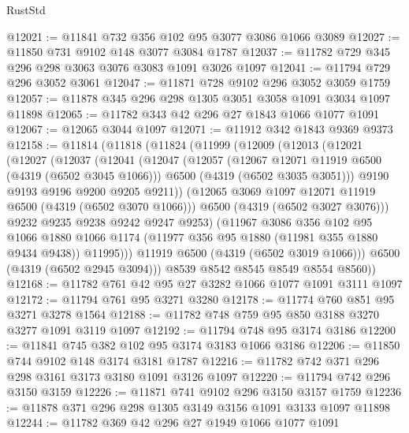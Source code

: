 \begin{lexlean}{RustStd}
\begin{coremodule}
@12021 := @11841 @732 @356 @102 @95 @3077 @3086 @1066 @3089
@12027 := @11850 @731 @9102 @148 @3077 @3084 @1787
@12037 := @11782 @729 @345 @296 @298 @3063 @3076 @3083 @1091 @3026 @1097
@12041 := @11794 @729 @296 @3052 @3061
@12047 := @11871 @728 @9102 @296 @3052 @3059 @1759
@12057 := @11878 @345 @296 @298 @1305 @3051 @3058 @1091 @3034 @1097 @11898
@12065 := @11782 @343 @42 @296 @27 @1843 @1066 @1077 @1091
@12067 := @12065 @3044 @1097
@12071 := @11912 @342 @1843 @9369 @9373
@12158 := @11814
    (@11818
      (@11824
        (@11999
          (@12009
            (@12013
              (@12021
                (@12027
                  (@12037
                    (@12041
                      (@12047
                        (@12057
                          (@12067 @12071 @11919 @6500 (@4319 (@6502 @3045 @1066)))
                          @6500
                          (@4319 (@6502 @3035 @3051)))
                        @9190
                        @9193
                        @9196
                        @9200
                        @9205
                        @9211))
                    (@12065 @3069 @1097 @12071 @11919 @6500 (@4319 (@6502 @3070 @1066)))
                    @6500
                    (@4319 (@6502 @3027 @3076)))
                  @9232
                  @9235
                  @9238
                  @9242
                  @9247
                  @9253)
                (@11967
                  @3086
                  @356
                  @102
                  @95
                  @1066
                  @1880
                  @1066
                  @1174
                  (@11977 @356 @95 @1880 (@11981 @355 @1880 @9434 @9438))
                  @11995)))
            @11919
            @6500
            (@4319 (@6502 @3019 @1066)))
          @6500
          (@4319 (@6502 @2945 @3094)))
        @8539
        @8542
        @8545
        @8549
        @8554
        @8560))
@12168 := @11782 @761 @42 @95 @27 @3282 @1066 @1077 @1091 @3111 @1097
@12172 := @11794 @761 @95 @3271 @3280
@12178 := @11774 @760 @851 @95 @3271 @3278 @1564
@12188 := @11782 @748 @759 @95 @850 @3188 @3270 @3277 @1091 @3119 @1097
@12192 := @11794 @748 @95 @3174 @3186
@12200 := @11841 @745 @382 @102 @95 @3174 @3183 @1066 @3186
@12206 := @11850 @744 @9102 @148 @3174 @3181 @1787
@12216 := @11782 @742 @371 @296 @298 @3161 @3173 @3180 @1091 @3126 @1097
@12220 := @11794 @742 @296 @3150 @3159
@12226 := @11871 @741 @9102 @296 @3150 @3157 @1759
@12236 := @11878 @371 @296 @298 @1305 @3149 @3156 @1091 @3133 @1097 @11898
@12244 := @11782 @369 @42 @296 @27 @1949 @1066 @1077 @1091

\end{coremodule}
\end{lexlean}
